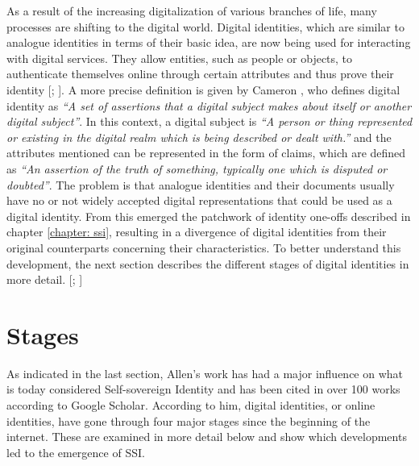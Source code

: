     As a result of the increasing digitalization of various branches of life, many processes are shifting to the digital world. Digital identities, which are similar to analogue identities in terms of their basic idea, are now being used for interacting with digital services. They allow entities, such as people or objects, to authenticate themselves online through certain attributes and thus prove their identity [\citealp[p. 103]{meinel_blockchain_2020}; \citealp{bundesdruckerei_so_2020}]. A more precise definition is given by Cameron \cite{cameron_laws_2005}, who defines digital identity as \textit{“A set of assertions that a digital subject makes about itself or another digital subject”}. In this context, a digital subject is \textit{“A person or thing represented or existing in the digital realm which is being described or dealt with.”} and the attributes mentioned can be represented in the form of claims, which are defined as \textit{“An assertion of the truth of something, typically one which is disputed or doubted”}. The problem is that analogue identities and their documents usually have no or not widely accepted \cite{krempl_e-government-studie_2019, koppenhofer_kabinettsbeschluss_2021} digital representations that could be used as a digital identity. From this emerged the patchwork of identity one-offs described in chapter \ref{chapter: ssi}, resulting in a divergence of digital identities from their original counterparts concerning their characteristics. To better understand this development, the next section describes the different stages of digital identities in more detail. [\citealp[p. 10]{struker_grundlagen_2021}; \citealp[p. 2]{ehrlich_self-sovereign_2021}]
    
	\section{Stages}
	
	As indicated in the last section, Allen's work \cite{allen_path_2016} has had a major influence on what is today considered Self-sovereign Identity and has been cited in over 100 works according to Google Scholar. According to him, digital identities, or online identities, have gone through four major stages since the beginning of the internet. These are examined in more detail below and show which developments led to the emergence of \ac{SSI}.
	
